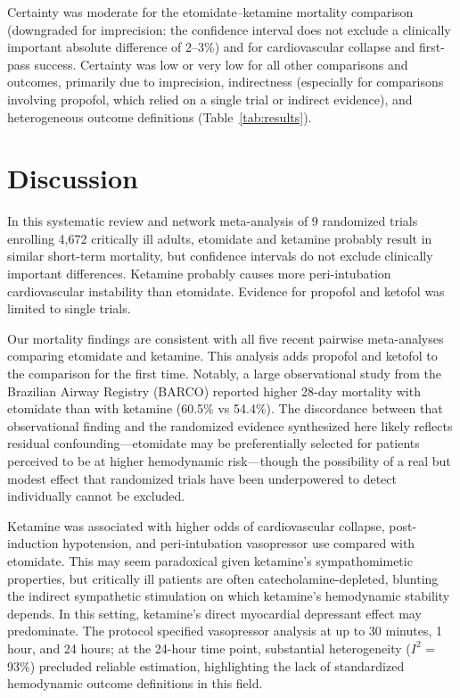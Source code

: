 \documentclass[11pt]{article}
\begin{document}
Certainty was moderate for the etomidate--ketamine mortality comparison (downgraded for imprecision: the confidence interval does not exclude a clinically important absolute difference of 2--3\%) and for cardiovascular collapse and first-pass success. Certainty was low or very low for all other comparisons and outcomes, primarily due to imprecision, indirectness (especially for comparisons involving propofol, which relied on a single trial or indirect evidence), and heterogeneous outcome definitions (Table~\ref{tab:results}).

\section{Discussion}

In this systematic review and network meta-analysis of 9 randomized trials enrolling 4,672 critically ill adults, etomidate and ketamine probably result in similar short-term mortality, but confidence intervals do not exclude clinically important differences. Ketamine probably causes more peri-intubation cardiovascular instability than etomidate. Evidence for propofol and ketofol was limited to single trials.

Our mortality findings are consistent with all five recent pairwise meta-analyses comparing etomidate and ketamine.\cite{kotani2023,koroki2024,greer2025,daghmouri2025,demorais2025} This analysis adds propofol and ketofol to the comparison for the first time. Notably, a large observational study from the Brazilian Airway Registry (BARCO) reported higher 28-day mortality with etomidate than with ketamine (60.5\% vs 54.4\%).\cite{maia2025} The discordance between that observational finding and the randomized evidence synthesized here likely reflects residual confounding---etomidate may be preferentially selected for patients perceived to be at higher hemodynamic risk---though the possibility of a real but modest effect that randomized trials have been underpowered to detect individually cannot be excluded.

Ketamine was associated with higher odds of cardiovascular collapse, post-induction hypotension, and peri-intubation vasopressor use compared with etomidate. This may seem paradoxical given ketamine's sympathomimetic properties, but critically ill patients are often catecholamine-depleted, blunting the indirect sympathetic stimulation on which ketamine's hemodynamic stability depends. In this setting, ketamine's direct myocardial depressant effect may predominate.\cite{waxman1980} The protocol specified vasopressor analysis at up to 30 minutes, 1 hour, and 24 hours; at the 24-hour time point, substantial heterogeneity ($I^2$ = 93\%) precluded reliable estimation, highlighting the lack of standardized hemodynamic outcome definitions in this field.
\end{document}
